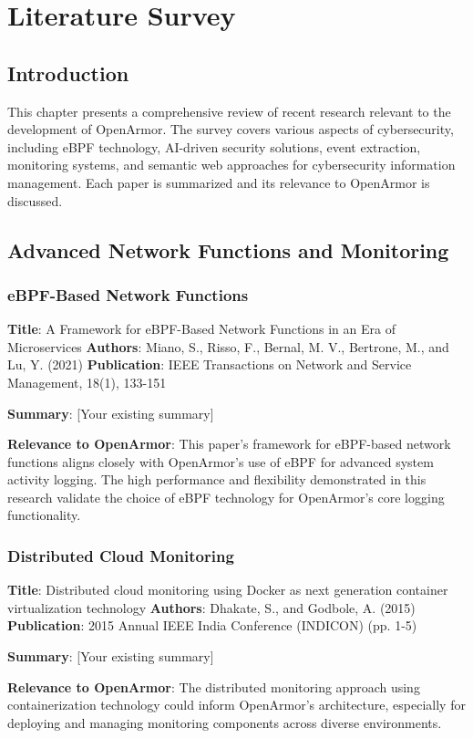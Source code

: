 \chapter{Literature Survey}

\section{Introduction}
This chapter presents a comprehensive review of recent research relevant to the development of OpenArmor. The survey covers various aspects of cybersecurity, including eBPF technology, AI-driven security solutions, event extraction, monitoring systems, and semantic web approaches for cybersecurity information management. Each paper is summarized and its relevance to OpenArmor is discussed.

\section{Advanced Network Functions and Monitoring}
\subsection{eBPF-Based Network Functions}
\textbf{Title}: A Framework for eBPF-Based Network Functions in an Era of Microservices 
\textbf{Authors}: Miano, S., Risso, F., Bernal, M. V., Bertrone, M., and Lu, Y. (2021)
\textbf{Publication}: IEEE Transactions on Network and Service Management, 18(1), 133-151

\textbf{Summary}: [Your existing summary]

\textbf{Relevance to OpenArmor}: This paper's framework for eBPF-based network functions aligns closely with OpenArmor's use of eBPF for advanced system activity logging. The high performance and flexibility demonstrated in this research validate the choice of eBPF technology for OpenArmor's core logging functionality.

\subsection{Distributed Cloud Monitoring}
\textbf{Title}: Distributed cloud monitoring using Docker as next generation container virtualization technology
\textbf{Authors}: Dhakate, S., and Godbole, A. (2015)
\textbf{Publication}: 2015 Annual IEEE India Conference (INDICON) (pp. 1-5)

\textbf{Summary}: [Your existing summary]

\textbf{Relevance to OpenArmor}: The distributed monitoring approach using containerization technology could inform OpenArmor's architecture, especially for deploying and managing monitoring components across diverse environments.

